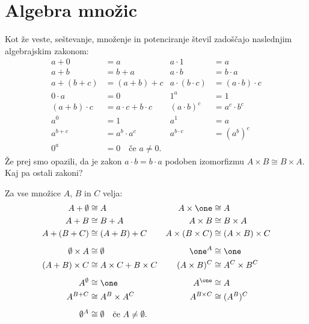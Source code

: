 
\section{Algebra množic}
\label{sec:algebra-mnozic}

Kot že veste, seštevanje, množenje in potenciranje števil zadoščajo naslednjim
algebrajskim zakonom:
%
\begin{align*}
  a + 0 &= a                   &     a \cdot 1 &= a \\
  a + b &= b + a               &     a \cdot b &= b \cdot a \\
  a + (b + c) &= (a + b) + c   &     a \cdot (b \cdot c) &= (a \cdot b) \cdot c \\[1ex]
  0 \cdot a &= 0                           &   1^a &= 1 \\
  (a + b) \cdot c &= a \cdot c + b \cdot c &   (a \cdot b)^c &= a^c \cdot b^c \\[1ex]
  a^0 &= 1                     &   a^1 &= a \\
  a^{b + c} &= a^b \cdot a^c   &   a^{b \cdot c} &= (a^b)^c \\[1ex]
  0^a &= 0 \quad \text{če $a \neq 0$.}
\end{align*}
%
Že prej smo opazili, da je zakon $a \cdot b = b \cdot a$ podoben izomorfizmu
$A \times B \cong B \times A$. Kaj pa ostali zakoni?

\begin{izrek}
  \label{izrek:algebra-mnozic}
  Za vse množice $A$, $B$ in $C$ velja:
  \begin{align*}
    A + \emptyset &\cong A                   &     A \times \one &\cong A \\
    A + B &\cong B + A               &     A \times B &\cong B \times A \\
    A + (B + C) &\cong (A + B) + C   &     A \times (B \times C) &\cong (A \times B) \times C \\[1ex]
    \emptyset \times A &\cong \emptyset                           &   \one^A &\cong \one \\
    (A + B) \times C &\cong A \times C + B \times C &   (A \times B)^C &\cong A^C \times B^C \\[1ex]
    A^\emptyset &\cong \one                     &   A^\one &\cong A \\
    A^{B + C} &\cong A^B \times A^C   &   A^{B \times C} &\cong (A^B)^C \\[1ex]
    \emptyset^A &\cong \emptyset \quad \text{če $A \neq \emptyset$.}
  \end{align*}
\end{izrek}


